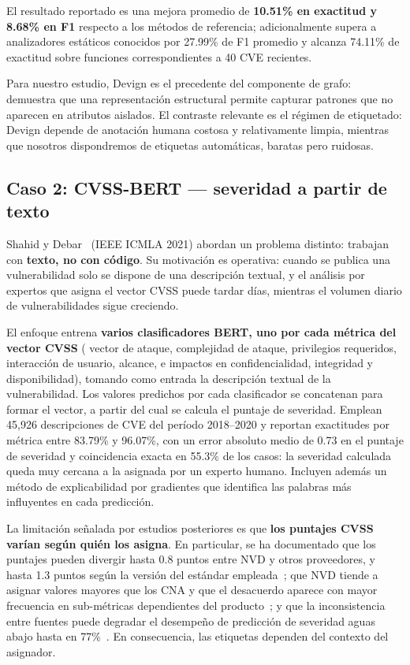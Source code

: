 \documentclass[conference]{IEEEtran}
\begin{document}
El resultado reportado es una mejora promedio de \textbf{10.51\% en exactitud y 8.68\% en F1} respecto a los m\'etodos de referencia; adicionalmente supera a analizadores est\'aticos conocidos por 27.99\% de F1 promedio y alcanza 74.11\% de exactitud sobre funciones correspondientes a 40 CVE recientes.

Para nuestro estudio, Devign es el precedente del componente de grafo: demuestra que una representaci\'on estructural permite capturar patrones que no aparecen en atributos aislados. El contraste relevante es el r\'egimen de etiquetado: Devign depende de anotaci\'on humana costosa y relativamente limpia, mientras que nosotros dispondremos de etiquetas autom\'aticas, baratas pero ruidosas.

\subsection{Caso 2: CVSS-BERT — severidad a partir de texto}
Shahid y Debar~\cite{cvssbert} (IEEE ICMLA 2021) abordan un problema distinto: trabajan con \textbf{texto, no con c\'odigo}. Su motivaci\'on es operativa: cuando se publica una vulnerabilidad solo se dispone de una descripci\'on textual, y el an\'alisis por expertos que asigna el vector CVSS puede tardar d\'ias, mientras el volumen diario de vulnerabilidades sigue creciendo.

El enfoque entrena \textbf{varios clasificadores BERT, uno por cada m\'etrica del vector CVSS} ( vector de ataque, complejidad de ataque, privilegios requeridos, interacci\'on de usuario, alcance, e impactos en confidencialidad, integridad y disponibilidad), tomando como entrada la descripci\'on textual de la vulnerabilidad. Los valores predichos por cada clasificador se concatenan para formar el vector, a partir del cual se calcula el puntaje de severidad. Emplean 45,926 descripciones de CVE del per\'iodo 2018--2020 y reportan exactitudes por m\'etrica entre 83.79\% y 96.07\%, con un error absoluto medio de 0.73 en el puntaje de severidad y coincidencia exacta en 55.3\% de los casos: la severidad calculada queda muy cercana a la asignada por un experto humano. Incluyen adem\'as un m\'etodo de explicabilidad por gradientes que identifica las palabras m\'as influyentes en cada predicci\'on.

La limitaci\'on se\~nalada por estudios posteriores es que \textbf{los puntajes CVSS var\'ian seg\'un qui\'en los asigna}. En particular, se ha documentado que los puntajes pueden divergir hasta 0.8 puntos entre NVD y otros proveedores, y hasta 1.3 puntos seg\'un la versión del est\'andar empleada~\cite{schwab}; que NVD tiende a asignar valores mayores que los CNA y que el desacuerdo aparece con mayor frecuencia en sub-m\'etricas dependientes del producto~\cite{gomes}; y que la inconsistencia entre fuentes puede degradar el desempe\~no de predicci\'on de severidad aguas abajo hasta en 77\%~\cite{le}. En consecuencia, las etiquetas dependen del contexto del asignador.
\end{document}
